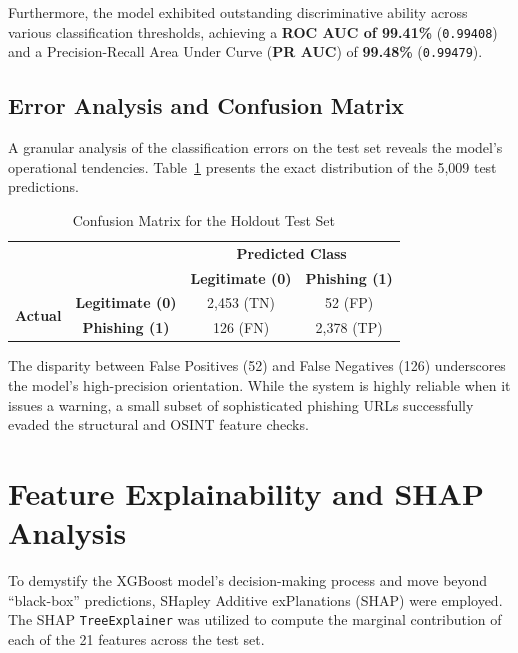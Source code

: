 Furthermore, the model exhibited outstanding discriminative ability
across various classification thresholds, achieving a \textbf{ROC AUC of
99.41\%} (\texttt{0.99408}) and a Precision-Recall Area Under Curve
(\textbf{PR AUC}) of \textbf{99.48\%} (\texttt{0.99479}).

\subsection{Error Analysis and Confusion
Matrix}\label{error-analysis-and-confusion-matrix}

A granular analysis of the classification errors on the test set reveals
the model's operational tendencies. Table~\ref{tab:confusion_matrix} presents the exact distribution of the 5,009 test predictions.

\begin{table}[htbp]
\centering
\caption{Confusion Matrix for the Holdout Test Set}
\label{tab:confusion_matrix}
\renewcommand{\arraystretch}{1.5}
\begin{tabular}{cc|cc}
\multicolumn{2}{c}{} & \multicolumn{2}{c}{\textbf{Predicted Class}} \\
\multicolumn{2}{c|}{} & \textbf{Legitimate (0)} & \textbf{Phishing (1)} \\
\hline
\multirow{2}{*}{\textbf{Actual}} & \textbf{Legitimate (0)} & 2,453 (TN) & 52 (FP) \\
& \textbf{Phishing (1)} & 126 (FN) & 2,378 (TP) \\
\end{tabular}
\end{table}

The disparity between False Positives (52) and False Negatives (126)
underscores the model's high-precision orientation. While the system is
highly reliable when it issues a warning, a small subset of
sophisticated phishing URLs successfully evaded the structural and OSINT
feature checks.

\section{Feature Explainability and SHAP
Analysis}\label{feature-explainability-and-shap-analysis}

To demystify the XGBoost model's decision-making process and move beyond
``black-box'' predictions, SHapley Additive exPlanations (SHAP) were
employed. The SHAP \texttt{TreeExplainer} was utilized to compute the
marginal contribution of each of the 21 features across the test set.

